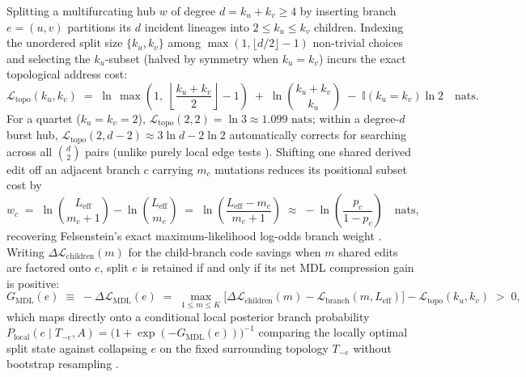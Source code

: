 \documentclass[12pt]{article}
\begin{document}
Splitting a multifurcating hub $w$ of degree $d = k_u + k_v \ge 4$ by inserting branch $e = (u,v)$ partitions its $d$ incident lineages into $2 \le k_u \le k_v$ children. Indexing the unordered split size $\{k_u, k_v\}$ among $\max(1, \lfloor d/2\rfloor - 1)$ non-trivial choices and selecting the $k_u$-subset (halved by symmetry when $k_u = k_v$) incurs the exact topological address cost:
\begin{equation}
    \mathcal{L}_{\text{topo}}(k_u, k_v) \;=\; \ln\,\max\!\left(1,\; \left\lfloor\frac{k_u + k_v}{2}\right\rfloor - 1\right) \;+\; \ln\binom{k_u + k_v}{k_u} \;-\; \mathbb{I}(k_u = k_v)\ln 2 \quad \text{nats}.
    \label{eq:topo_cost}
\end{equation}
For a quartet ($k_u = k_v = 2$), $\mathcal{L}_{\text{topo}}(2,2) = \ln 3 \approx 1.099\text{ nats}$; within a degree-$d$ burst hub, $\mathcal{L}_{\text{topo}}(2, d-2) \approx 3\ln d - 2\ln 2$ automatically corrects for searching across all $\binom{d}{2}$ pairs (unlike purely local edge tests \cite{anisimova2011survey,hoang2018ufboot2}). Shifting one shared derived edit off an adjacent branch $c$ carrying $m_c$ mutations reduces its positional subset cost by
\begin{equation}
    w_c \;=\; \ln\binom{L_{\text{eff}}}{m_c + 1} - \ln\binom{L_{\text{eff}}}{m_c} \;=\; \ln\!\left(\frac{L_{\text{eff}} - m_c}{m_c + 1}\right) \;\approx\; -\ln\!\left(\frac{p_c}{1 - p_c}\right) \quad \text{nats},
    \label{eq:marginal_weight}
\end{equation}
recovering Felsenstein's exact maximum-likelihood log-odds branch weight \cite{felsenstein1981evolutionary}. Writing $\Delta\mathcal{L}_{\text{children}}(m)$ for the child-branch code savings when $m$ shared edits are factored onto $e$, split $e$ is retained if and only if its net MDL compression gain is positive:
\begin{equation}
    G_{\text{MDL}}(e) \;\equiv\; -\Delta\mathcal{L}_{\text{MDL}}(e) \;=\; \max_{1 \le m \le K} \Big[ \Delta\mathcal{L}_{\text{children}}(m) - \mathcal{L}_{\text{branch}}(m, L_{\text{eff}}) \Big] - \mathcal{L}_{\text{topo}}(k_u, k_v) \;>\; 0,
    \label{eq:mdl_gain}
\end{equation}
which maps directly onto a conditional local posterior branch probability $P_{\text{local}}(e \mid T_{-e}, A) = \big(1 + \exp(-G_{\text{MDL}}(e))\big)^{-1}$ comparing the locally optimal split state against collapsing $e$ on the fixed surrounding topology $T_{-e}$ without bootstrap resampling \cite{felsenstein1985confidence}.
\end{document}
